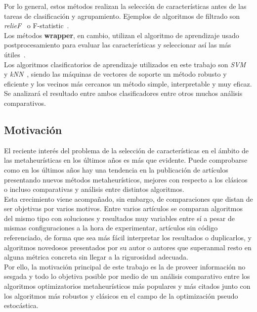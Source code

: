 Por lo general, estos métodos realizan la selección de características antes de las tareas de clasificación y
agrupamiento. Ejemplos de algoritmos de filtrado son \textit{relieF}~\cite{kira_practical_1992} o F-statistic~\cite{ding_minimum_2005}.\\[6pt]
Los métodos \textbf{wrapper}, en cambio, utilizan el algoritmo de aprendizaje usado postprocesamiento
para evaluar las características y seleccionar así las más útiles~\cite{miao_survey_2016}.\\[6pt]
Los algoritmos clasificatorios de aprendizaje utilizados en este trabajo son \textit{SVM}~\cite{cortes_support-vector_1995}
y \textit{kNN}~\cite{fix_discriminatory_1989,cover_nearest_1967}, siendo las máquinas de vectores de
soporte un método robusto y eficiente y los vecinos más cercanos un método simple, interpretable
y muy eficaz. Se analizará el resultado entre ambos clasificadores entre otros muchos análisis comparativos.

\subsection{Motivación}
El reciente interés del problema de la selección de características en el ámbito de las
metaheurísticas en los últimos años es más que evidente. Puede comprobarse como en los
últimos años hay una tendencia en la publicación de artículos presentando nuevos métodos
metaheurísticos, mejores con respecto a los clásicos o incluso comparativas y análisis entre
distintos algoritmos.\\[6pt]

Esta crecimiento viene acompañado, sin embargo, de comparaciones que distan de ser objetivas
por varios motivos. Entre varios artículos se comparan algoritmos del mismo tipo con
soluciones y resultados muy variables entre sí a pesar de mismas configuraciones a la hora
de experimentar, artículos sin código referenciado, de forma que sea más fácil interpretar
los resultados o duplicarlos, y algoritmos novedosos presentados por su autor o autores que
superanmal resto en alguna métrica concreta sin llegar a la rigurosidad adecuada.\\[6pt]

Por ello, la motivación principal de este trabajo es la de proveer información no sesgada y
todo lo objetiva posible por medio de un análisis comparativo entre los
algoritmos optimizatorios metaheurísticos más populares y más citados junto con los
algoritmos más robustos y clásicos en el campo de la optimización pseudo estocástica.

